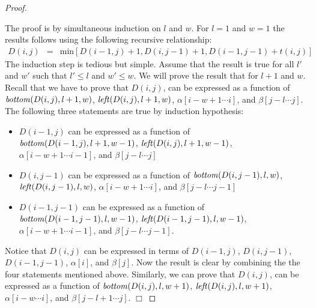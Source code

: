 \begin{proof}
\label{appendix:lemma}

The proof is by simultaneous induction on $l$ and $w$. For $l=1$ and
$w=1$ the results follows using the following recursive relationship:
\begin{eqnarray*}
D(i,j) & = & \mbox{min} [ D(i-1,j) + 1, D(i,j-1)+1, D(i-1,j-1)+t(i,j) ]
\end{eqnarray*}
The induction step is tedious but simple. Assume that the result is true for all $l'$ and $w'$ such that $l' \leq l$ and
$w' \leq w$.  We will prove the result that for $l+1$ and $w$. Recall that
we have to prove that $D(i,j)$, can be expressed as a function of ${\it
bottom}(D(i,j),l+1,w)$, ${\it left}(D(i,j),l+1,w)$, $ \alpha [ i-w+1
\cdots i ]$, and $\beta [ j-l \cdots j]$.  The following three statements are true
by induction hypothesis:
\begin{itemize}
\item $D(i-1,j)$ can be expressed as a function of ${\it
bottom}(D(i-1,j),l+1,w-1)$, ${\it left}(D(i,j),l+1,w-1)$, $ \alpha [ i-w+1
\cdots i-1 ]$, and $\beta [ j-l \cdots j]$

\item $D(i,j-1)$ can be expressed as a function of ${\it
bottom}(D(i,j-1),l,w)$, ${\it left}(D(i,j-1),l,w)$, $ \alpha [ i-w+1
\cdots i ]$, and $\beta [ j-l \cdots j-1]$

\item $D(i-1,j-1)$ can be expressed as a function of ${\it
bottom}(D(i-1,j-1),l,w-1)$, ${\it left}(D(i-1,j-1),l,w-1)$, $ \alpha [ i-w+1
\cdots i-1 ]$, and $\beta [ j-l \cdots j-1]$.
\end{itemize}
Notice that $D(i,j)$
can be expressed in terms of $D(i-1,j)$, $D(i,j-1)$, $D(i-1,j-1)$, 
$\alpha[i]$,  and $\beta[j]$. Now the result is clear by combining the
the four statements mentioned above. Similarly, we can prove that $D(i,j)$, can be expressed as a function of ${\it
bottom}(D(i,j),l,w+1)$, ${\it left}(D(i,j),l,w+1)$, $ \alpha [ i-w
\cdots i ]$, and $\beta [ j-l+1 \cdots j]$. $\Box$
\end{proof}
